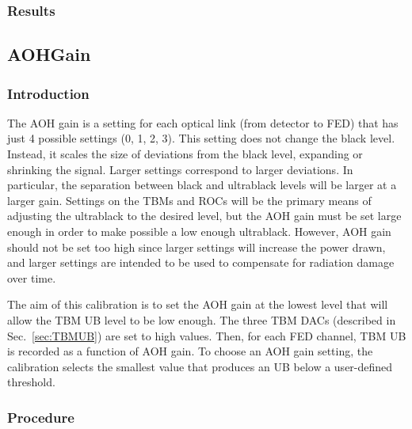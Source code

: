 \subsubsection{Results}

\subsection{AOHGain}

\subsubsection{Introduction}

The AOH gain is a setting for each optical link (from detector to FED) that has just 4 possible settings (0, 1, 2, 3).  This setting does not change the black level.  Instead, it scales the size of deviations from the black level, expanding or shrinking the signal.  Larger settings correspond to larger deviations.  In particular, the separation between black and ultrablack levels will be larger at a larger gain.  Settings on the TBMs and ROCs will be the primary means of adjusting the ultrablack to the desired level, but the AOH gain must be set large enough in order to make possible a low enough ultrablack.  However, AOH gain should not be set too high since larger settings will increase the power drawn, and larger settings are intended to be used to compensate for radiation damage over time.

The aim of this calibration is to set the AOH gain at the lowest level that will allow the TBM UB level to be low enough.  The three TBM DACs (described in Sec.~\ref{sec:TBMUB}) are set to high values.  Then, for each FED channel, TBM UB is recorded as a function of AOH gain.  To choose an AOH gain setting, the calibration selects the smallest value that produces an UB below a user-defined threshold.

\subsubsection{Procedure}

